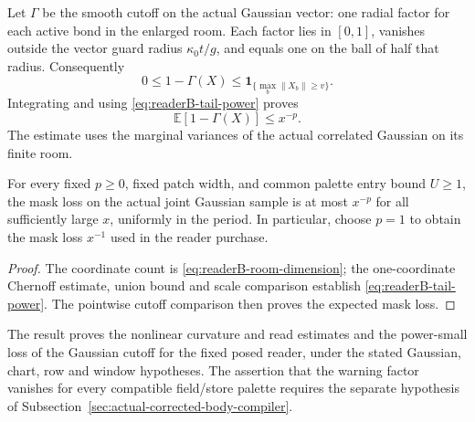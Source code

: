Let $\Gamma$ be the smooth cutoff on the actual Gaussian vector: one
radial factor for each active bond in the enlarged room. Each factor
lies in $[0,1]$, vanishes outside the vector guard radius $\kappa_0t/g$,
and equals one on the ball of half that radius. Consequently
\[
 0\leq1-\Gamma(X)\leq
      \mathbf1_{\{\max_b\|X_b\|\geq v\}}.
\]
Integrating and using \eqref{eq:readerB-tail-power} proves
\[
 \mathbb E[1-\Gamma(X)]\leq x^{-p}.
\]
The estimate uses the marginal variances of the actual correlated
Gaussian on its finite room.

\begin{lemma}
\label{lem:readerB-mask}
For every fixed $p\geq0$, fixed patch width, and common palette entry bound
$U\geq1$, the mask loss on the actual joint Gaussian sample is at most
$x^{-p}$ for all sufficiently large $x$, uniformly in the period. In
particular, choose $p=1$ to obtain the mask loss $x^{-1}$ used in the
reader purchase.
\end{lemma}
\begin{proof}
The coordinate count is \eqref{eq:readerB-room-dimension}; the one-coordinate
Chernoff estimate, union bound and scale comparison establish
\eqref{eq:readerB-tail-power}. The pointwise cutoff comparison then proves
the expected mask loss.
\end{proof}

\begin{remark}
The result proves the nonlinear curvature and read estimates and the power-small
loss of the Gaussian cutoff for the fixed posed reader, under the stated
Gaussian, chart, row and window hypotheses. The assertion that the
warning factor vanishes for every compatible field/store palette requires
the separate hypothesis of Subsection~\ref{sec:actual-corrected-body-compiler}.
\end{remark}
